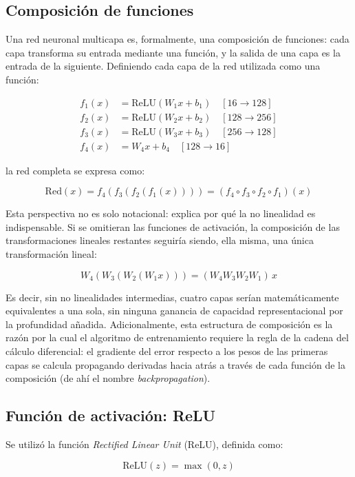 \documentclass[12pt,a4paper]{article}
\begin{document}
\subsection{Composición de funciones}

Una red neuronal multicapa es, formalmente, una composición de funciones: cada capa transforma su entrada mediante una función, y la salida de una capa es la entrada de la siguiente. Definiendo cada capa de la red utilizada como una función:

\begin{align*}
    f_1(x) &= \mathrm{ReLU}(W_1x + b_1) \quad [16 \to 128] \\
    f_2(x) &= \mathrm{ReLU}(W_2x + b_2) \quad [128 \to 256] \\
    f_3(x) &= \mathrm{ReLU}(W_3x + b_3) \quad [256 \to 128] \\
    f_4(x) &= W_4x + b_4 \quad [128 \to 16]
\end{align*}

la red completa se expresa como:

\[
    \mathrm{Red}(x) = f_4(f_3(f_2(f_1(x)))) = (f_4 \circ f_3 \circ f_2 \circ f_1)(x)
\]

Esta perspectiva no es solo notacional: explica por qué la no linealidad es indispensable. Si se omitieran las funciones de activación, la composición de las transformaciones lineales restantes seguiría siendo, ella misma, una única transformación lineal:

\[
    W_4(W_3(W_2(W_1x))) = (W_4W_3W_2W_1)\,x
\]

Es decir, sin no linealidades intermedias, cuatro capas serían matemáticamente equivalentes a una sola, sin ninguna ganancia de capacidad representacional por la profundidad añadida. Adicionalmente, esta estructura de composición es la razón por la cual el algoritmo de entrenamiento requiere la regla de la cadena del cálculo diferencial: el gradiente del error respecto a los pesos de las primeras capas se calcula propagando derivadas hacia atrás a través de cada función de la composición (de ahí el nombre \textit{backpropagation}).

\subsection{Función de activación: ReLU}

Se utilizó la función \textit{Rectified Linear Unit} (ReLU), definida como:

\[
    \mathrm{ReLU}(z) = \max(0, z)
\]
\end{document}

